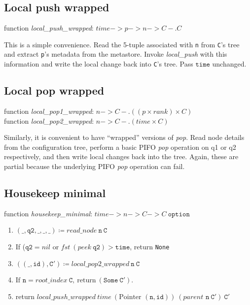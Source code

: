 \documentclass{article}
\begin{document}
\subsection{Local push wrapped}

function \textit{local\_push\_wrapped}: $\mathit{time} -> p -> n -> C -. C$ 

This is a simple convenience. 
Read the 5-tuple associated with \texttt{n} from \texttt{C}'s tree and 
extract \texttt{p}'s metadata from the metastore.
Invoke \textit{local\_push} with this information 
and write the local change back into \texttt{C}'s tree. 
Pass $\mathtt{time}$ unchanged.

\subsection{Local pop wrapped}

function \textit{local\_pop1\_wrapped}: $n -> C -. ((p \times \mathit{rank}) \times C)$  \\
function \textit{local\_pop2\_wrapped}: $n -> C -. (\mathit{time} \times C)$ 

Similarly, it is convenient to have ``wrapped'' versions of \textit{pop}. 
Read node details from the configuration tree, perform a basic PIFO \textit{pop} operation on q1 or q2 respectively,
and then write local changes back into the tree.
Again, these are partial because the underlying PIFO \textit{pop} operation can fail.

\subsection{Housekeep minimal}

function \textit{housekeep\_minimal}: $\mathit{time} -> n -> C -> C~\mathtt{option}$ 

\begin{enumerate}
\item $(\_, \mathtt{q2}, \_, \_, \_) \coloneqq \mathit{read\_node}~\mathtt{n~C}$
\item If ($\mathtt{q2} = \textit{nil}$ or $\mathit{fst~(peek~\mathtt{q2})} > \mathtt{time}$, return \texttt{None}
\item $((\_, \mathtt{id}), \mathtt{C'}) \coloneqq \textit{local\_pop2\_wrapped}~\mathtt{n~C}$
\item $\text{If } \mathtt{n} = \mathit{root\_index}~\mathtt{C},~\text{return}~(\mathtt{Some~C'}).$
\item return $\mathit{local\_push\_wrapped~time}~(\text{Pointer } \mathtt{(n, id)})~(\textit{parent } \mathtt{n~C'}) ~\mathtt{C'}$
\end{enumerate}
\end{document}
